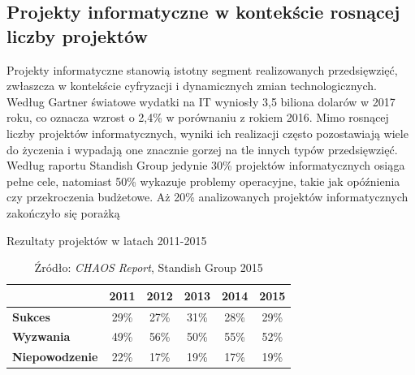 \subsection{Projekty informatyczne w kontekście rosnącej liczby projektów}
Projekty informatyczne stanowią istotny segment realizowanych przedsięwzięć, zwłaszcza w kontekście cyfryzacji i dynamicznych zmian technologicznych. Według Gartner światowe wydatki na IT wyniosły 3,5 biliona dolarów w 2017 roku, co oznacza wzrost o 2,4\% w porównaniu z rokiem 2016.\autocite{gartner} Mimo rosnącej liczby projektów informatycznych, wyniki ich realizacji często pozostawiają wiele do życzenia i wypadają one znacznie gorzej na tle innych typów przedsięwzięć. Według raportu Standish Group jedynie 30\% projektów informatycznych osiąga pełne cele, natomiast 50\% wykazuje problemy operacyjne, takie jak opóźnienia czy przekroczenia budżetowe. Aż 20\% analizowanych projektów informatycznych zakończyło się porażką 
\begin{table}[h]
    \caption{Rezultaty projektów w latach 2011-2015}
    \label{tab:projekty}
    \centering
    \renewcommand{\arraystretch}{1.5}
    \setlength{\tabcolsep}{10pt}
    \begin{tabular}{|l|c|c|c|c|c|}
        \hline
        \rowcolor{blue!50} 
        \multicolumn{1}{|c|}{} & \textbf{2011} & \textbf{2012} & \textbf{2013} & \textbf{2014} & \textbf{2015} \\
        \hline
        \rowcolor{green!50} \textbf{Sukces} & 29\% & 27\% & 31\% & 28\% & 29\% \\
        \hline
        \rowcolor{yellow!50}
        \textbf{Wyzwania} & 49\% & 56\% & 50\% & 55\% & 52\% \\
        \hline
        \rowcolor{red!50} \textbf{Niepowodzenie} & 22\% & 17\% & 19\% & 17\% & 19\% \\
        \hline
    \end{tabular}
    \caption*{Źródło: \textit{CHAOS Report}, Standish Group 2015}
\end{table}


